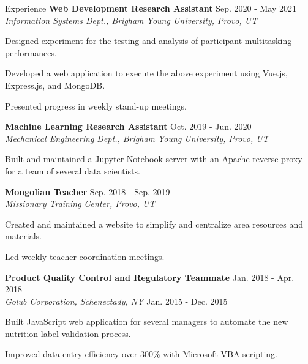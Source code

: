 \documentclass{resume} %
\begin{document}
\begin{rSection}{Experience}
    \textbf{Web Development Research Assistant}\hfill{ Sep.  2020 - May 2021}\\
    \textit{Information Systems Dept., Brigham Young University, Provo, UT} 
    \begin{compactitem}
        \item Designed experiment for the testing and analysis of participant multitasking
            performances.
        \item Developed a web application to execute the above experiment using Vue.js, Express.js, and
            MongoDB.
        \item Presented progress in weekly stand-up meetings.
    \end{compactitem}
\textbf{Machine Learning Research Assistant} \hfill{Oct. 2019
- Jun. 2020}\\
\textit{Mechanical Engineering Dept., Brigham Young University, Provo, UT}
    \begin{compactitem}
        \item Built and maintained a Jupyter Notebook server with an Apache reverse proxy for a team of
            several data scientists.
    \end{compactitem}
\textbf{Mongolian Teacher} \hfill {Sep. 2018 - Sep. 2019}\\
\textit{Missionary Training Center, Provo, UT} 
    \begin{compactitem}
        \item Created and maintained a website to simplify and centralize area resources and
            materials.
        \item Led weekly teacher coordination meetings.
    \end{compactitem}
\textbf{Product Quality Control and Regulatory Teammate}    \hfill {Jan. 2018 -
Apr. 2018}\\
\textit{Golub Corporation, Schenectady, NY}                 \hfill {Jan. 2015 -
Dec. 2015}  
    \begin{compactitem}
        \item Built JavaScript web application for several managers to automate the new nutrition label
            validation process.
        \item Improved data entry efficiency over 300\% with Microsoft VBA scripting.
    \end{compactitem}
\end{rSection}
\end{document}
